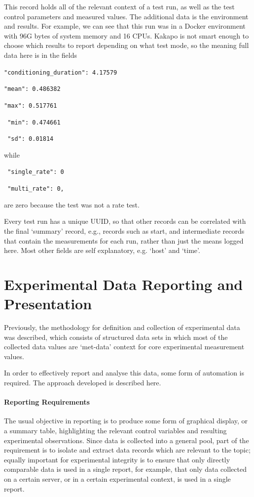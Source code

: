 This record holds all of the relevant context of a test run, as well as the test control parameters and measured values.
The additional data is the environment and results.
For example, we can see that this run was in a Docker environment with 96G bytes of system memory and 16 CPUs.
Kakapo is not smart enough to choose which results to report depending on what test mode, so the meaning full data here is in the fields

\verb|"conditioning_duration": 4.17579|

\verb|"mean": 0.486382|

\verb|"max": 0.517761|

\verb| "min": 0.474661|

\verb| "sd": 0.01814|

 while
 
 \verb| "single_rate": 0|
 
 \verb| "multi_rate": 0,|
 
 are zero because the test was not a rate test.

 Every test run has a unique UUID, so that other records can be correlated with the final `summary' record, e.g., records such as start, and intermediate records that contain the measurements for each run, rather than just the means logged here.  Most other fields are self explanatory, e.g. `host' and `time'.


\section{Experimental Data Reporting and Presentation}

Previously, the methodology for definition and collection of experimental data was described, which consists of structured data sets in which most of the collected data values are `met-data' context for core experimental measurement values.

In order to effectively report and analyse this data, some form of automation is required.
The approach developed is described here.

\paragraph{Reporting Requirements}
The usual objective in reporting is to produce some form of graphical display, or a summary table, highlighting the relevant control variables and resulting experimental observations.
Since data is collected into a general pool, part of the requirement is to isolate and extract data records which are relevant to the topic; equally important for experimental integrity is to ensure that only directly comparable data is used in a single report, for example, that only data collected on a certain server, or in a certain experimental context, is used in a single report.


